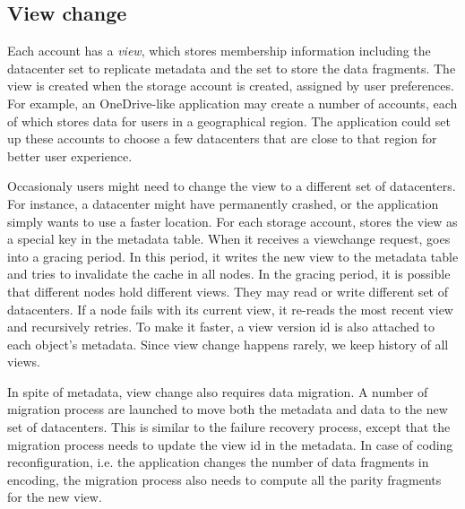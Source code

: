 \subsection{View change}
Each {\name} account has a \emph{view}, which stores membership information
including the datacenter set to replicate metadata and the set to store the
data fragments. The view is created when the storage account is created,
assigned by user preferences. For example, an OneDrive-like application may
create a number of {\name} accounts, each of which stores data for users
in a geographical region. The application could set up these accounts to
choose a few datacenters that are close to that region for better user
experience.

Occasionaly {\name} users might need to change the view to a different set
of datacenters. For instance, a datacenter might have permanently crashed,
or the application simply wants to use a faster location. For each storage
account, {\name} stores the view as a special key in the metadata table.
When it receives a viewchange request, {\name} goes into a gracing period.
In this period, it writes the new view to the metadata table and tries to
invalidate the cache in all {\name} nodes. In the gracing period, it is
possible that different nodes hold different views. They may read or write
different set of datacenters. If a {\name} node fails with its current
view, it re-reads the most recent view and recursively retries. To make it
faster, a view version id is also attached to each object's metadata.
Since view change happens rarely, we keep history of all views.

In spite of metadata, view change also requires data migration. A number
of migration process are launched to move both the metadata and data to
the new set of datacenters. This is similar to the failure recovery process,
except that the migration process needs to update the view id in the
metadata. In case of coding reconfiguration, i.e. the application changes
the number of data fragments in encoding, the migration process also needs
to compute all the parity fragments for the new view.


